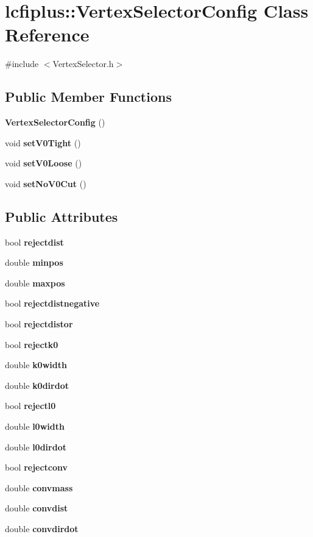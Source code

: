\section{lcfiplus\+:\+:Vertex\+Selector\+Config Class Reference}
\label{classlcfiplus_1_1VertexSelectorConfig}


{\ttfamily \#include $<$Vertex\+Selector.\+h$>$}

\subsection*{Public Member Functions}
\begin{DoxyCompactItemize}
\item 
\textbf{ Vertex\+Selector\+Config} ()
\item 
void \textbf{ set\+V0\+Tight} ()
\item 
void \textbf{ set\+V0\+Loose} ()
\item 
void \textbf{ set\+No\+V0\+Cut} ()
\end{DoxyCompactItemize}
\subsection*{Public Attributes}
\begin{DoxyCompactItemize}
\item 
bool \textbf{ rejectdist}
\item 
double \textbf{ minpos}
\item 
double \textbf{ maxpos}
\item 
bool \textbf{ rejectdistnegative}
\item 
bool \textbf{ rejectdistor}
\item 
bool \textbf{ rejectk0}
\item 
double \textbf{ k0width}
\item 
double \textbf{ k0dirdot}
\item 
bool \textbf{ rejectl0}
\item 
double \textbf{ l0width}
\item 
double \textbf{ l0dirdot}
\item 
bool \textbf{ rejectconv}
\item 
double \textbf{ convmass}
\item 
double \textbf{ convdist}
\item 
double \textbf{ convdirdot}
\end{DoxyCompactItemize}


